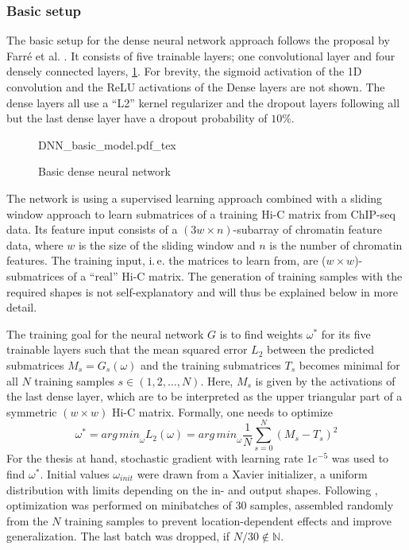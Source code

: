 \subsubsection{Basic setup} \label{sec:methods:basicSetup}
The basic setup for the dense neural network approach follows the proposal by Farr\'e et al. \cite{Farre2018a}.
It consists of five trainable layers; one convolutional layer and four densely connected layers, \cref{fig:methods:basic_dnn}.
For brevity, the sigmoid activation of the 1D convolution and the ReLU activations of the Dense layers are not shown.
The dense layers all use a ``L2'' kernel regularizer and the dropout layers following all but the last dense layer have a dropout probability of $10\%$.
\begin{figure}[htb]
    \small
    \centering
    {DNN_basic_model.pdf_tex}
    \caption{Basic dense neural network}
    \label{fig:methods:basic_dnn}
\end{figure}

The network is using a supervised learning approach combined with a sliding window approach 
to learn submatrices of a training Hi-C matrix from ChIP-seq data.
Its feature input consists of a $(3w \times n)$-subarray of chromatin feature data,  
where $w$ is the size of the sliding window and $n$ is the number of chromatin features.
The training input, i.\,e. the matrices to learn from, are ($w\times w$)-submatrices of a ``real'' Hi-C matrix.
The generation of training samples with the required shapes is not self-explanatory and will thus be explained below in more detail.

The training goal for the neural network $G$ is to find weights $\omega^*$ for its five trainable layers 
such that the mean squared error $L_2$ between the predicted submatrices $M_s = G_s(\omega)$ 
and the training submatrices $T_s$ becomes minimal for all $N$ training samples $s \in (1,2,\dots, N)$. 
Here, $M_s$ is given by the activations of the last dense layer, which are to be interpreted as the upper triangular 
part of a symmetric $(w\times w)$ Hi-C matrix.
Formally, one needs to optimize
\begin{equation}
 \omega^* = {arg\,min}_\omega L_2(\omega) = {arg\,min}_\omega \frac{1}{N} \sum_{s=0}^N (M_s - T_s)^2 \label{eq:methods:nn-mse}
\end{equation} 
For the thesis at hand, stochastic gradient with learning rate $1e^{-5}$  was used to find $\omega^*$.
Initial values $\omega_{init}$ were drawn from a Xavier initializer, a uniform distribution with limits depending on the in- and output shapes.
Following \cite{Farre2018a}, optimization was performed on minibatches of 30 samples, assembled randomly from the $N$ training samples
to prevent location-dependent effects and improve generalization.
The last batch was dropped, if $N/30 \not \in \mathbb{N}$. 

